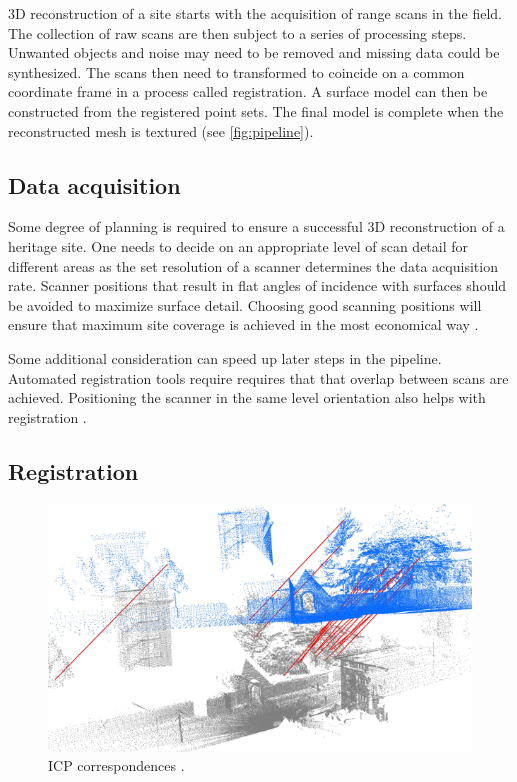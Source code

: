 3D reconstruction of a site starts with the acquisition of range scans in the field. The collection of raw scans are then subject to a series of processing steps. Unwanted objects and noise may need to be removed and missing data could be synthesized. The scans then need to transformed to coincide on a common coordinate frame in a process called registration. A surface model can then be constructed from the registered point sets. The final model is complete when the reconstructed mesh is textured (see \autoref{fig:pipeline}).

\subsection{Data acquisition}
Some degree of planning is required to ensure a successful 3D reconstruction of a heritage site. One needs to decide on an appropriate level of scan detail for different areas as the set resolution of a scanner determines the data acquisition rate. Scanner positions that result in flat angles of incidence with surfaces should be avoided to maximize surface detail. Choosing good scanning positions will ensure that maximum site coverage is achieved in the most economical way \cite{Ruther2011}.

Some additional consideration can speed up later steps in the pipeline. Automated registration tools require requires that that overlap between scans are achieved. Positioning the scanner in the same level orientation also helps with registration \cite{Ruther2011}.

\subsection{Registration}  \label{sec:registration}

\begin{figure}[ht]
  \centering
  \includegraphics[width=0.6\linewidth]{images/registration}
  \caption{ICP correspondences \protect\footnotemark.}
  \label{fig:registration}
\end{figure}

